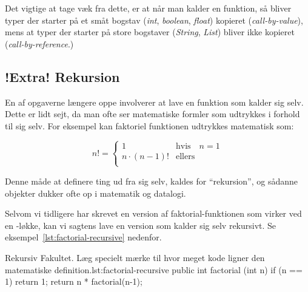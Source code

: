         Det vigtige at tage væk fra dette, er at når man kalder en
        funktion, så bliver typer der starter på et småt bogstav
        (\emph{int}, \emph{boolean}, \emph{float}) kopieret
        (\emph{call-by-value}), mens at typer der starter på store
        bogstaver (\emph{String}, \emph{List}) bliver ikke kopieret
        (\emph{call-by-reference}.)


	\subsection{!Extra! Rekursion}


        En af opgaverne længere  oppe
        involverer at lave en funktion som kalder sig selv. Dette er
        lidt sejt, da man ofte ser matematiske formler som udtrykkes i
        forhold til sig selv. For eksempel kan faktoriel funktionen
        udtrykkes matematisk som:

        \begin{equation}
            n! = \begin{cases}
                       1 & \text{hvis} \quad n = 1 \\
                       n\cdot(n-1)! & \text{ellers} \\
                  \end{cases}
        \end{equation}

        Denne måde at definere ting ud fra sig selv, kaldes for
        ``rekursion'', og sådanne objekter dukker ofte op i matematik
        og datalogi.


        Selvom vi tidligere har skrevet en version af
        faktorial-funktionen som virker ved en -løkke,
        kan vi sagtens lave en version som kalder sig selv rekursivt.
        Se eksempel~\ref{lst:factorial-recursive} nedenfor.

        \begin{JavaCode}{Rekursiv Fakultet. Læg specielt mærke til hvor meget kode ligner den matematiske definition.}{lst:factorial-recursive}
            public int factorial (int n) {
                if (n == 1)   return 1;
                return n * factorial(n-1);
            }
        \end{JavaCode}

